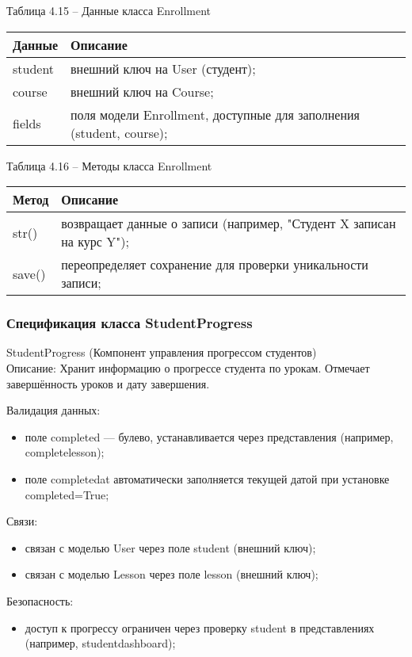 Таблица 4.15 – Данные класса Enrollment \\
\begin{tabular}{|p{4cm}|p{8cm}|}
	\hline
	Данные & Описание \\
	\hline
	student & внешний ключ на User (студент); \\
	course & внешний ключ на Course; \\
	fields & поля модели Enrollment, доступные для заполнения (student, course); \\
	\hline
\end{tabular}

Таблица 4.16 – Методы класса Enrollment \\
\begin{tabular}{|p{4cm}|p{8cm}|}
	\hline
	Метод & Описание \\
	\hline
	str() & возвращает данные о записи (например, "Студент X записан на курс Y"); \\
	save() & переопределяет сохранение для проверки уникальности записи; \\
	\hline
\end{tabular}

\subsubsection{Спецификация класса StudentProgress}
StudentProgress (Компонент управления прогрессом студентов) \\
Описание: Хранит информацию о прогрессе студента по урокам. Отмечает завершённость уроков и дату завершения.

Валидация данных: 
\begin{itemize}
	\item поле completed — булево, устанавливается через представления (например, completelesson); 
	\item поле completedat автоматически заполняется текущей датой при установке completed=True; 
\end{itemize}

Связи: 
\begin{itemize}
	\item связан с моделью User через поле student (внешний ключ); 
	\item связан с моделью Lesson через поле lesson (внешний ключ); 
\end{itemize}

Безопасность: 
\begin{itemize}
	\item доступ к прогрессу ограничен через проверку student в представлениях (например, studentdashboard); 
\end{itemize}

